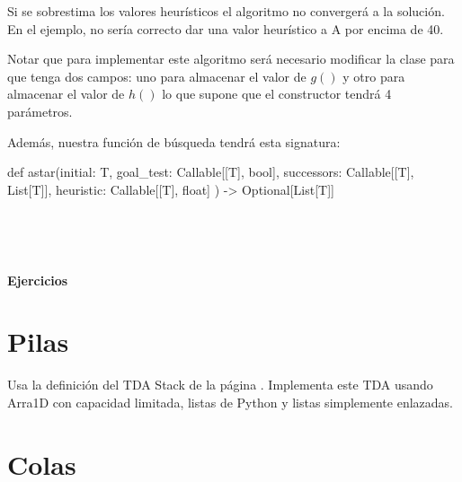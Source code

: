 \begin{itemize}
\begin{itemize}
Si se sobrestima los valores heurísticos el algoritmo no convergerá a la solución.
En el ejemplo, no sería correcto dar una valor heurístico a A por encima de 40.

\end{itemize}

Notar que para implementar este algoritmo será necesario
modificar la clase  para que tenga dos campos: uno para almacenar el valor de $g()$ y otro para almacenar el valor de $h()$ lo que supone que el constructor tendrá 4 parámetros.

Además, nuestra función de búsqueda tendrá esta signatura:

\hfil
\begin{minipage}{.5\textwidth}
\begin{pyverbatim}[][frame=single]
def astar(initial: T, 
          goal_test: Callable[[T], bool], 
          successors: Callable[[T], List[T]], 
          heuristic: Callable[[T], float]
          ) 
          -> Optional[List[T]]
\end{pyverbatim}
\end{minipage}

\end{itemize}

\


\


\centerline{\Large \bf Ejercicios}



\formatoEjercicio
 


\separacion
\section{Pilas} 

Usa la definición del TDA Stack de la página \pageref{sec:Pila}.
Implementa este TDA usando Arra1D con capacidad limitada, listas de Python y listas simplemente enlazadas.


%


\separacion
\section{Colas} 

